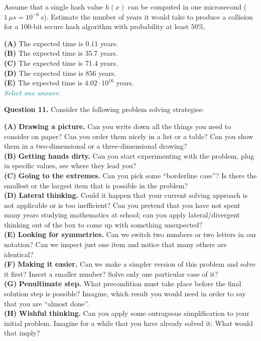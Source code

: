 \documentclass[jou]{apa6}
\begin{document}
Assume that a single hash value $h(x)$ can be computed in one microsecond
($1\,\mu{}s = 10^{-6}\,s$). Estimate the number of years it would take to produce a
collision for a 100-bit secure hash algorithm with probability at least $50\%$. 

{\bf (A)} The expected time is $0.11$ years.\\
{\bf (B)} The expected time is $35.7$ years.\\
{\bf (C)} The expected time is $71.4$ years.\\
{\bf (D)} The expected time is $856$ years.\\
{\bf (E)} The expected time is $4.02\cdot 10^{16}$ years.\\
\textcolor{teal}{\em Select one answer.}


\vspace{10pt}
{\bf Question 11.} Consider the following 
problem solving strategies: 

{\footnotesize
{\bf (A)} {\bf Drawing a picture.} Can you 
write down all the things you need to consider on paper? 
Can you order them nicely in a list or a table? 
Can you show them in a two-dimensional or a three-dimensional drawing?\\
{\bf (B)} {\bf Getting hands dirty.} Can you start experimenting with the 
problem, plug in specific values, see where they lead you?\\
{\bf (C)} {\bf Going to the extremes.} Can you pick some ``borderline case''?
Is there the smallest or the largest item that is possible in the problem?\\
{\bf (D)} {\bf Lateral thinking.} Could it happen that your current solving approach 
is not applicable or is too inefficient? Can you pretend that you 
have not spent many years studying mathematics at school; 
can you apply lateral/divergent thinking out of the box to 
come up with something unexpected?\\
{\bf (E)} {\bf Looking for symmetries.} Can we switch two numbers or two letters in our 
notation? Can we inspect just one item and notice that many others are identical?\\
{\bf (F)} {\bf Making it easier.} Can we make a simpler version of this problem and
solve it first? Insert a smaller number? Solve only one particular case of it?\\
{\bf (G)} {\bf Penultimate step.} What precondition must take place before 
the final solution step is possible? Imagine, which result you would need 
in order to say that you are ``almost done''.\\
{\bf (H)} {\bf Wishful thinking.} Can you apply some outrageous simplification to your 
initial problem. Imagine for a while that you have already solved it: What would that imply?
}
\end{document}
